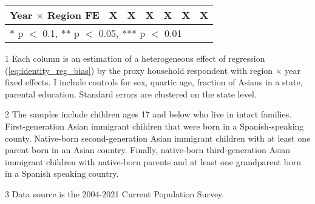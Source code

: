 \begin{table}[!h]
{\begin{threeparttable}
\begin{tabular}[t]{lcccccc}
Year $\times$ Region FE & X & X & X & X & X & X\\
\bottomrule
\multicolumn{7}{l}{\rule{0pt}{1em}* p $<$ 0.1, ** p $<$ 0.05, *** p $<$ 0.01}\\
\end{tabular}
\begin{tablenotes}
\small
\item[1] \footnotesize{Each column is an estimation of a heterogeneous effect of regression (\ref{eq:identity_reg_bias}) by 
                      the proxy household respondent with region × year fixed effects. 
                      I include controls for sex, quartic age, fraction of Asians in a state, parental education.
                      Standard errors are clustered on the state level.}
\item[2] \footnotesize{The samples include children ages 17 and below who live in intact families. 
                      First-generation Asian immigrant children that were born in a 
                      Spanish-speaking county. Native-born second-generation Asian 
                      immigrant children with at least one parent born in an Asian 
                      country. Finally, native-born third-generation Asian immigrant children 
                      with native-born parents and at least one grandparent born in a Spanish 
                      speaking country.}
\item[3] \footnotesize{Data source is the 2004-2021 Current Population Survey.}
\end{tablenotes}
\end{threeparttable}}
\end{table}
